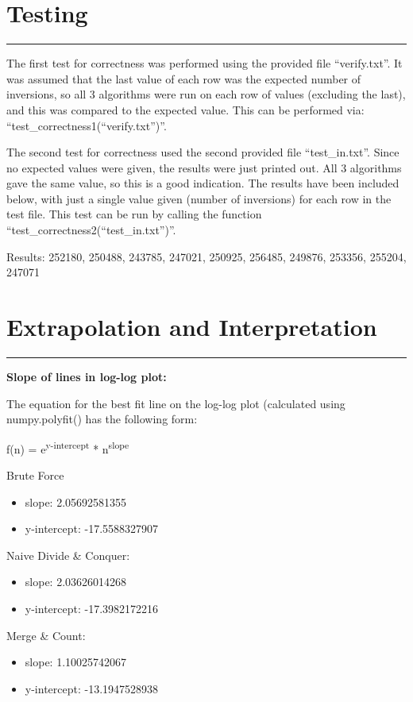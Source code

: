 \documentclass[letterpaper,10pt,titlepage,fleqn]{article}
\begin{document}
\section*{Testing}
\hrule
The first test for correctness was performed using the provided file ``verify.txt''. It was assumed that the last value of each row was the expected number of inversions, so all 3 algorithms were run on each row of values (excluding the last), and this was compared to the expected value. This can be performed via: ``test\_correctness1(``verify.txt'')''.

The second test for correctness used the second provided file ``test\_in.txt''. Since no expected values were given, the results were just printed out. All 3 algorithms gave the same value, so this is a good indication. The results have been included below, with just a single value given (number of inversions) for each row in the test file. This test can be run by calling the function ``test\_correctness2(``test\_in.txt'')''.

Results:
252180, 250488, 243785, 247021, 250925, 256485, 249876, 253356, 255204, 247071

\section*{Extrapolation and Interpretation}
\hrule

\begin{centering}
\textbf{Slope of lines in log-log plot:}
\end{centering}

The equation for the best fit line on the log-log plot (calculated using numpy.polyfit() has the following form:

f(n) = e\textsuperscript{y-intercept} * n\textsuperscript{slope}

Brute Force
\begin{itemize}
\item slope: 2.05692581355
\item y-intercept: -17.5588327907
\end{itemize}

Naive Divide \& Conquer:
\begin{itemize}
\item slope: 2.03626014268
\item y-intercept: -17.3982172216
\end{itemize}

Merge \& Count:
\begin{itemize}
\item slope: 1.10025742067
\item y-intercept: -13.1947528938
\end{itemize}
\end{document}

